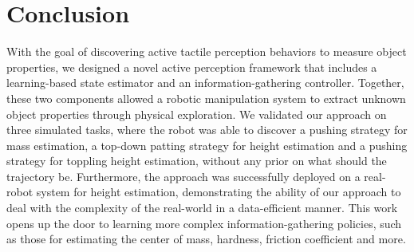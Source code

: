 \documentclass[anon]{l4dc2024}
\begin{document}
\section{Conclusion}
With the goal of discovering active tactile perception behaviors to measure object properties, we designed a novel active perception framework that includes a learning-based state estimator and an information-gathering controller.
Together, these two components allowed a robotic manipulation system to extract unknown object properties through physical exploration.
We validated our approach on three simulated tasks, where the robot was able to discover a pushing strategy for mass estimation, a top-down patting strategy for height estimation and a pushing strategy for toppling height estimation, without any prior on what should the trajectory be.
Furthermore, the approach was successfully deployed on a real-robot system for height estimation, demonstrating the ability of our approach to deal with the complexity of the real-world in a data-efficient manner.
This work opens up the door to learning more complex information-gathering policies, such as those for estimating the center of mass, hardness, friction coefficient and more.


\end{document}
